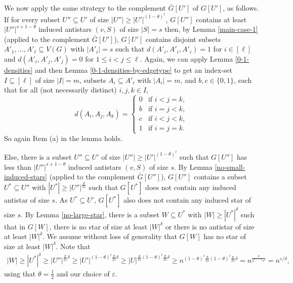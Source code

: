 \documentclass[11pt]{article}
\let\oldendproof\endproof
\renewenvironment{proof}[1][\proofname]{%
	\oldproof[\bf #1]%
}{\oldendproof}
\theoremstyle{plain}
\begin{document}
\begin{proof}
    We now apply the same strategy to the complement $\bar{G}[U']$ of $G[U']$, as follows. If for every subset $U'' \subseteq U'$ of size $|U''| \geq |U'|^{(1-\theta)^{\ell}}$, $G[U'']$ contains at least $|U''|^{s+1-\theta}$ induced antistars $(v,S)$ of size $|S| = s$ then, by Lemma \ref{main-case-1} (applied to the complement $\bar{G}[U']$), $G[U']$ contains disjoint subsets $A'_1,\dots,A'_{\ell} \subseteq V(G)$ with $|A'_i|=s$ such that $d(A'_i,A'_i,A'_i)=1$ for $i \in [\ell]$ and $d(A'_i,A'_j,A'_j)=0$ for $1\leq i < j \leq \ell$. Again, we can apply Lemma \ref{0-1-densities} and then Lemma \ref{0-1-densities-by-edgetype} to get an index-set $I \subseteq [\ell]$ of size $|I| = m$, subsets $A_i \subseteq A'_i$ with $|A_i|=m$, and $b,c \in \{0,1\}$, such that for all (not necessarily distinct) $i,j,k \in I$, 
    $$d(A_i,A_j,A_k) = \begin{cases}
    0 &\text{if } i<j=k,\\
    b &\text{if } i=j<k,\\
    c &\text{if } i<j<k,\\
    1 &\text{if } i=j=k.
    \end{cases}$$
    So again Item (a) in the lemma holds. 

    Else, there is a subset $U'' \subseteq U'$ of size $|U''| \geq |U'|^{(1-\theta)^{\ell}}$ such that $G[U'']$ has less than $|U''|^{s+1-\theta}$ induced antistars $(v,S)$ of size $s$. By Lemma \ref{no-small-induced-stars} (applied to the complement $\bar{G}[U'']$), $G[U'']$ contains a subset $U^* \subseteq U''$ with $|U^*| \geq |U''|^{\frac{\theta}{2s}}$ such that $G[U^*]$ does not contain any induced antistar of size $s$. As $U^* \subseteq U'$, $G[U^*]$ also does not contain any induced star of size $s$. By Lemma \ref{no-large-star}, there is a subset $W \subseteq U^*$ with $|W| \geq |U^*|^\delta$ such that in $G[W]$, there is no star of size at least $|W|^\delta$ or there is no antistar of size at least $|W|^\delta$. 
    We assume without loss of generality that $G[W]$ has no star of size at least $|W|^\delta$. 
    Note that  
    \begin{align*}
    |W| \geq |U^*|^\delta \geq |U''|^{\frac{\theta}{2s} \delta} \geq |U'|^{(1-\theta)^{\ell} \frac{\theta}{2s} \delta} \geq |U|^{\frac{\theta}{2s} (1-\theta)^{\ell} \frac{\theta}{2s} \delta} \geq n^{(1-\theta)^{\ell} \frac{\theta}{2s} (1-\theta)^{\ell} \frac{\theta}{2s} \delta} = n^{\frac{\delta}{2^{2\ell+4} s^2}} = n^{\varepsilon/\delta},
    \end{align*} 
    using that $\theta = \frac{1}{2}$ and our choice of $\varepsilon$.
    

\end{proof}
\end{document}
